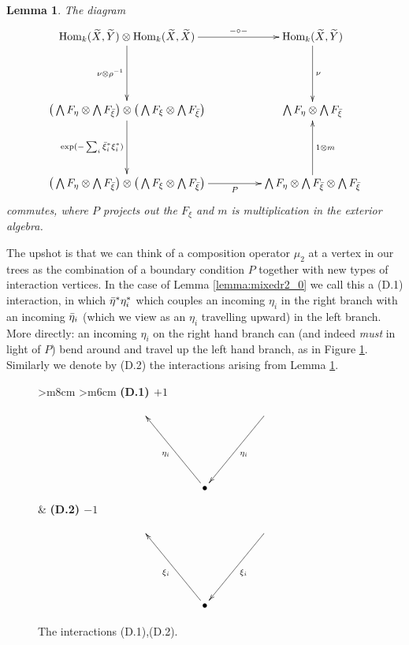 \documentclass[english,letter paper,12pt,leqno]{article}
\newtheorem{lemma}[theorem]{Lemma}
\theoremstyle{example}
\numberwithin{equation}{section}
\def\Hom{\operatorname{Hom}}
\def\be{\begin{equation}}
\def\ee{\end{equation}}
\begin{document}
\begin{lemma}\label{lemma:mixedr2_1} The diagram
\be
\xymatrix@C+2pc@R+2pc{
\Hom_k( \widetilde{X}, \widetilde{Y} ) \otimes \Hom_k( \widetilde{X}, \widetilde{X} ) \ar[d]_-{\nu \otimes \rho^{-1}} \ar[r]^-{- \circ -} & \Hom_k( \widetilde{X}, \widetilde{Y} ) \ar[d]^-\nu\\
\big( \bigwedge F_\eta \otimes \bigwedge F_{\Bar{\xi}} \big) \otimes \big( \bigwedge F_\xi \otimes \bigwedge F_{\Bar{\xi}} \big) \ar[d]_-{\exp( -\sum_i \Bar{\xi}_i^* \xi_i^* )} & \bigwedge F_\eta \otimes \bigwedge F_{\Bar{\xi}} \\
\big( \bigwedge F_\eta \otimes \bigwedge F_{\Bar{\xi}} \big) \otimes \big( \bigwedge F_\xi \otimes \bigwedge F_{\Bar{\xi}} \big) \ar[r]_-P & \bigwedge F_\eta \otimes \bigwedge F_{\Bar{\xi}} \otimes \bigwedge F_{\Bar{\xi}} \ar[u]_-{1 \otimes m}
}
\ee
commutes, where $P$ projects out the $F_{\xi}$ and $m$ is multiplication in the exterior algebra.
\end{lemma}

The upshot is that we can think of a composition operator $\mu_2$ at a vertex in our trees as the combination of a boundary condition $P$ together with new types of interaction vertices. In the case of Lemma \ref{lemma:mixedr2_0} we call this a (D.1) interaction, in which $\Bar{\eta}^* \eta_i^*$ which couples an incoming $\eta_i$ in the right branch with an incoming $\Bar{\eta}_i$ (which we view as an $\eta_i$ travelling upward) in the left branch. More directly: an incoming $\eta_i$ on the right hand branch can (and indeed \emph{must} in light of $P$) bend around and travel up the left hand branch, as in Figure \ref{fig:run_around_corners}. Similarly we denote by (D.2) the interactions arising from Lemma \ref{lemma:mixedr2_1}.

\begin{figure}
\begin{center}
\begin{tabular}{ >{\centering}m{8cm} >{\centering}m{6cm} }
\textbf{(D.1) $+1$}
\vspace{0.1cm}
\[
\xymatrix@C+2pc@R+3pc{
& & \ar[dl]^-{\eta_i} \\
& \bullet \ar[ul]^-{\eta_i}
}
\]
&
\textbf{(D.2) $-1$}
\vspace{0.1cm}
\[
\xymatrix@C+2pc@R+3pc{
& & \ar[dl]^-{\xi_i} \\
& \bullet \ar[ul]^-{\xi_i}
}
\]
\end{tabular}
\end{center}
\centering
\caption{The interactions (D.1),(D.2).}\label{fig:run_around_corners}
\end{figure}
\end{document}
